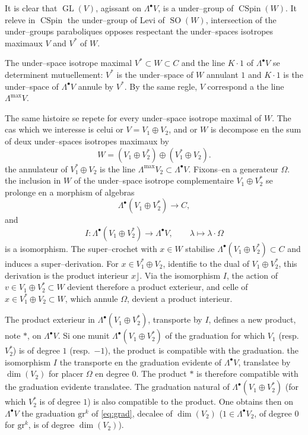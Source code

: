 \documentclass[11pt,a4paper]{article}
\theoremstyle{plain}
\theoremstyle{definition}
\DeclareMathOperator{\CSpin}{CSpin}
\DeclareMathOperator{\GL}{GL}
\DeclareMathOperator{\SO}{SO}
\begin{document}
It is clear that $\GL(V)$, agissant on $\Lambda^\bullet V$, is a under--group of $\CSpin(W)$. It releve in $\CSpin$ the under--group of Levi of $\SO(W)$, intersection of the under--groups paraboliques opposes respectant the under--spaces isotropes maximaux $V$ and $V^*$ of $W$.

The under--space isotrope maximal $V^* \subset W \subset C$ and the line $K \cdot 1$ of $\Lambda^\bullet V$ se determinent mutuellement: $V^*$ is the under--space of $W$ annulant $1$ and $K \cdot 1$ is the under--space of $\Lambda^\bullet V$ annule by $V^*$. By the same regle, $V$ correspond a the line $\Lambda^{\max} V$.

The same histoire se repete for every under--space isotrope maximal of $W$. The cas which we interesse is celui or $V = V_1 \oplus V_2$, and or $W$ is decompose en the sum of deux under--spaces isotropes maximaux by
\[
W = (V_1 \oplus V_2^*) \oplus (V_1^* \oplus V_2) .
\]
the annulateur of $V_1^* \oplus V_2$ is the line $\Lambda^{\max} V_2 \subset \Lambda^\bullet V$. Fixons--en a generateur $\Omega$. the inclusion in $W$ of the under--space isotrope complementaire $V_1 \oplus V_2^*$ se prolonge en a morphism of algebras
\[
\Lambda^\bullet(V_1 \oplus V_2^*) \longrightarrow C ,
\]
and
\begin{equation}\label{eq:isom}
I : \Lambda^\bullet(V_1 \oplus V_2^*) \longrightarrow \Lambda^\bullet V, \qquad \lambda \longmapsto \lambda \cdot \Omega
\end{equation}
is a isomorphism. The super--crochet with $x \in W$ stabilise $\Lambda^\bullet(V_1 \oplus V_2^*) \subset C$ and induces a super--derivation. For $x \in V_1^* \oplus V_2$, identifie to the dual of $V_1 \oplus V_2^*$, this derivation is the product interieur $x \rfloor$. Via the isomorphism $I$, the action of $v \in V_1 \oplus V_2^* \subset W$ devient therefore a product exterieur, and celle of $x \in V_1^* \oplus V_2 \subset W$, which annule $\Omega$, devient a product interieur.

The product exterieur in $\Lambda^\bullet(V_1 \oplus V_2^*)$, transporte by $I$, defines a new product, note $*$, on $\Lambda^\bullet V$. Si one munit $\Lambda^\bullet(V_1 \oplus V_2^*)$ of the graduation for which $V_1$ (resp.\ $V_2^*$) is of degree $1$ (resp.\ $-1$), the product is compatible with the graduation. the isomorphism $I$ the transporte en the graduation evidente of $\Lambda^\bullet V$, translatee by $\dim(V_2)$ for placer $\Omega$ en degree $0$. The product $*$ is therefore compatible with the graduation evidente translatee. The graduation natural of $\Lambda^\bullet(V_1 \oplus V_2^*)$ (for which $V_2^*$ is of degree $1$) is also compatible to the product. One obtains then on $\Lambda^\bullet V$ the graduation $\mathrm{gr}^k$ of \eqref{eq:grad}, decalee of $\dim(V_2)$ ($1 \in \Lambda^\bullet V_2$, of degree $0$ for $\mathrm{gr}^k$, is of degree $\dim(V_2)$).
\end{document}
